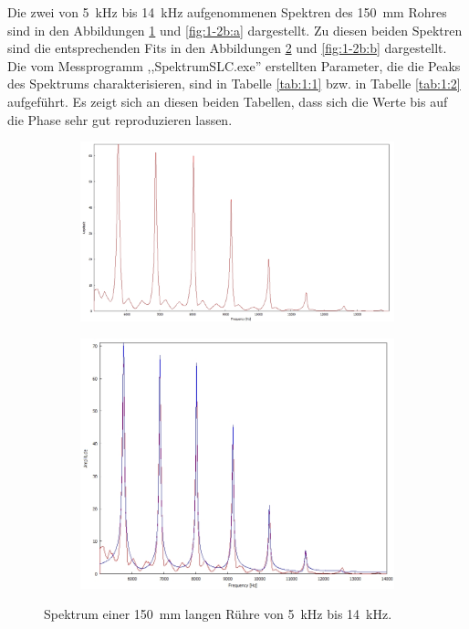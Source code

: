 Die zwei von 5~kHz bis 14~kHz aufgenommenen Spektren des 150~mm Rohres sind in den Abbildungen \ref{fig:1-2a:a} und \ref{fig:1-2b:a} dargestellt.
Zu diesen beiden Spektren sind die entsprechenden Fits in den Abbildungen \ref{fig:1-2a:b} und \ref{fig:1-2b:b} dargestellt.
Die vom Messprogramm ,,SpektrumSLC.exe'' erstellten Parameter, die die Peaks des Spektrums charakterisieren, sind in Tabelle \ref{tab:1:1} bzw. in Tabelle \ref{tab:1:2} aufgeführt.
Es zeigt sich an diesen beiden Tabellen, dass sich die Werte bis auf die Phase sehr gut reproduzieren lassen.
\begin{figure}
\centering
\begin{subfigure}{0.4\textwidth}
\vspace{0.8cm}
\includegraphics[width=\textwidth]{content/messungen/Chapter1/1-2img.jpg}
\label{fig:1-2a:a}
\end{subfigure}
\begin{subfigure}{0.4\textwidth}
\includegraphics[width=\textwidth]{content/messungen/Chapter1/fit_img1.jpg}
\label{fig:1-2a:b}
\end{subfigure}
\caption{Spektrum einer 150~mm langen Rühre von 5~kHz bis 14~kHz.}
\label{fig:1-2a}
\end{figure}

